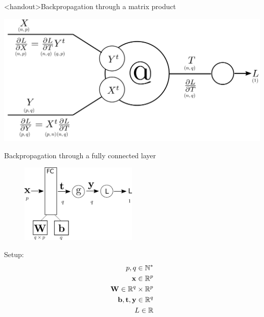 \documentclass[xcolor=pdftex,dvipsnames,table,mathserif]{beamer}
\begin{document}
\begin{frame}<handout>{Backpropagation through a matrix product}

  \includegraphics[width=\textwidth]{matrix_mult_4.png}

\end{frame}









\begin{frame}{Backpropagation through a fully connected layer}
  \begin{figure}
    \includegraphics[width=0.5\textwidth]{bp_fc.png}
  \end{figure}

  Setup:
  \begin{eqnarray*}
    p, q \in \mathbb{N}^*\\
    \mathbf{x} \in \mathbb{R}^p \\
    \mathbf{W} \in \mathbb{R}^q \times \mathbb{R}^p \\
    \mathbf{b}, \mathbf{t}, \mathbf{y} \in \mathbb{R}^q \\
    L \in \mathbb{R}
  \end{eqnarray*}

\end{frame}
\end{document}
